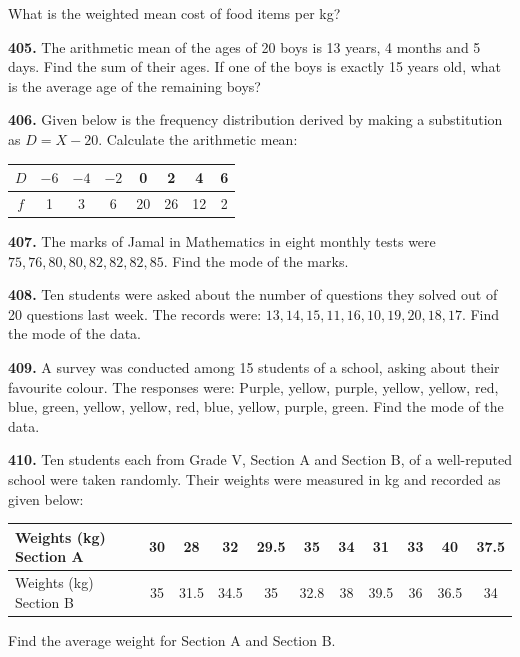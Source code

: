 \documentclass[11pt]{article}
\begin{document}
What is the weighted mean cost of food items per kg?

\bigskip
\noindent\textbf{405.} The arithmetic mean of the ages of 20 boys is 13 years, 4 months and 5 days. Find the sum of their ages. If one of the boys is exactly 15 years old, what is the average age of the remaining boys?

\bigskip
\noindent\textbf{406.} Given below is the frequency distribution derived by making a substitution as $D = X - 20$. Calculate the arithmetic mean:

\begin{center}
\begin{tabular}{|c|c|c|c|c|c|c|c|}
\hline
$D$ & $-6$ & $-4$ & $-2$ & 0 & 2 & 4 & 6 \\
\hline
$f$ & 1 & 3 & 6 & 20 & 26 & 12 & 2 \\
\hline
\end{tabular}
\end{center}

\bigskip
\noindent\textbf{407.} The marks of Jamal in Mathematics in eight monthly tests were $75, 76, 80, 80, 82, 82, 82, 85$. Find the mode of the marks.

\bigskip
\noindent\textbf{408.} Ten students were asked about the number of questions they solved out of 20 questions last week. The records were: $13, 14, 15, 11, 16, 10, 19, 20, 18, 17$. Find the mode of the data.

\bigskip
\noindent\textbf{409.} A survey was conducted among 15 students of a school, asking about their favourite colour. The responses were: Purple, yellow, purple, yellow, yellow, red, blue, green, yellow, yellow, red, blue, yellow, purple, green. Find the mode of the data.

\bigskip
\noindent\textbf{410.} Ten students each from Grade V, Section A and Section B, of a well-reputed school were taken randomly. Their weights were measured in kg and recorded as given below:

\begin{center}
\begin{tabular}{|l|c|c|c|c|c|c|c|c|c|c|}
\hline
Weights (kg) Section A & 30 & 28 & 32 & 29.5 & 35 & 34 & 31 & 33 & 40 & 37.5 \\
\hline
Weights (kg) Section B & 35 & 31.5 & 34.5 & 35 & 32.8 & 38 & 39.5 & 36 & 36.5 & 34 \\
\hline
\end{tabular}
\end{center}

Find the average weight for Section A and Section B.
\end{document}
